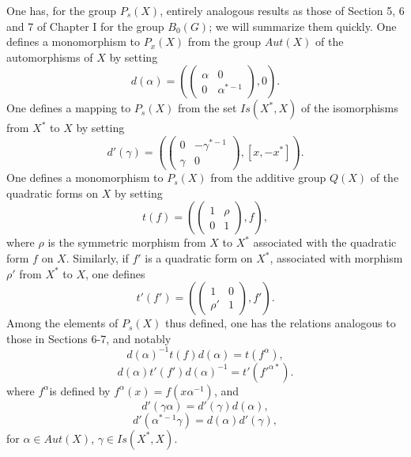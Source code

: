 \documentclass[12pt]{amsart}
\newcounter{ssection}
\renewcommand{\subsection}{
  \addtocounter{ssection}{1}{\bf  \arabic{ssection}.\  }}
\begin{document}
\subsection{}
One has, for the group $P_{s}(X)$, entirely analogous results as
those of Section 5, 6 and 7 of Chapter I for the group $B_{0}(G)$;
we will summarize them quickly. One defines a monomorphism to $P_{x}(X)$
from the group $Aut(X)$ of the automorphisms of $X$ by setting\[
d(\alpha)=\left(\left(\begin{array}{cc}
\alpha & 0\\
0 & \alpha^{*-1}\end{array}\right),0\right).\]
One defines a mapping to $P_{s}(X)$ from the set $Is(X^{*},X)$ of
the isomorphisms from $X^{*}$ to $X$ by setting\[
d'(\gamma)=\left(\left(\begin{array}{cc}
0 & -\gamma^{*-1}\\
\gamma & 0\end{array}\right),[x,-x^{*}]\right).\]
One defines a monomorphism to $P_{s}(X)$ from the additive group
$Q(X)$ of the quadratic forms on $X$ by setting\[
t(f)=\left(\left(\begin{array}{cc}
1 & \rho\\
0 & 1\end{array}\right),f\right),\]
where $\rho$ is the symmetric morphism from $X$ to $X^{*}$ associated
with the quadratic form $f$ on $X$. Similarly, if $f'$ is a quadratic
form on $X^{*}$, associated with morphism $\rho'$ from $X^{*}$
to $X$, one defines\[
t'(f')=\left(\left(\begin{array}{cc}
1 & 0\\
\rho' & 1\end{array}\right),f'\right).\]
Among the elements of $P_{s}(X)$ thus defined, one has the relations
analogous to those in Sections 6-7, and notably\[
d(\alpha)^{-1}t(f)d(\alpha)=t(f^{\alpha}),\]
\[
d(\alpha)t'(f')d(\alpha)^{-1}=t'(f'^{\alpha*}).\]
where $f^{\alpha}$is defined by $f^{\alpha}(x)=f(x\alpha^{-1})$,
and\[
d'(\gamma\alpha)=d'(\gamma)d(\alpha),\]
\[
d'(\alpha^{*-1}\gamma)=d(\alpha)d'(\gamma),\]
for $\alpha\in Aut(X)$, $\gamma\in Is(X^{*},X)$.
\end{document}
